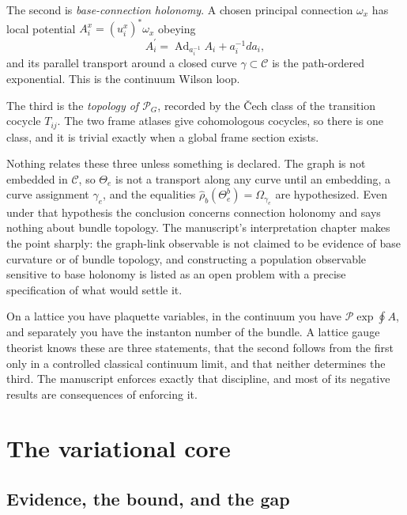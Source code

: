 \documentclass[11pt,letterpaper]{article}
\newcommand{\Ad}{\operatorname{Ad}}
\begin{document}
The second is \emph{base-connection holonomy}. A chosen principal connection \(\omega_x\) has local potential \(A_i^x=(u_i^x)^*\omega_x\) obeying
\begin{equation}
  A_i^{\prime}=\Ad_{a_i^{-1}}A_i+a_i^{-1}da_i,
  \label{eq:gauge-potential}
\end{equation}
and its parallel transport around a closed curve \(\gamma\subset\mathcal C\) is the path-ordered exponential. This is the continuum Wilson loop.

The third is the \emph{topology of \(\mathscr P_G\)}, recorded by the \v Cech class of the transition cocycle \(T_{ij}\). The two frame atlases give cohomologous cocycles, so there is one class, and it is trivial exactly when a global frame section exists.

Nothing relates these three unless something is declared. The graph is not embedded in \(\mathcal C\), so \(\Theta_e\) is not a transport along any curve until an embedding, a curve assignment \(\gamma_e\), and the equalities \(\widehat\rho_b(\Theta_e^b)=\Omega_{\gamma_e}\) are hypothesized. Even under that hypothesis the conclusion concerns connection holonomy and says nothing about bundle topology. The manuscript's interpretation chapter makes the point sharply: the graph-link observable is not claimed to be evidence of base curvature or of bundle topology, and constructing a population observable sensitive to base holonomy is listed as an open problem with a precise specification of what would settle it.

\begin{translationbox}
On a lattice you have plaquette variables, in the continuum you have \(\mathcal P\exp\oint A\), and separately you have the instanton number of the bundle. A lattice gauge theorist knows these are three statements, that the second follows from the first only in a controlled classical continuum limit, and that neither determines the third. The manuscript enforces exactly that discipline, and most of its negative results are consequences of enforcing it.
\end{translationbox}

\section{The variational core}

\subsection{Evidence, the bound, and the gap}
\end{document}
